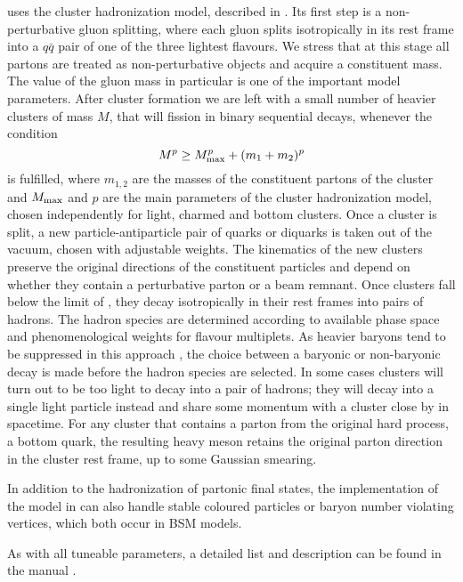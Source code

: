 \Herwigpp uses the cluster hadronization model, described in
.  Its first step is a non-perturbative gluon
splitting, where each gluon splits
isotropically in its rest frame into a $q\bar q$ pair of
one of the three lightest flavours. We stress that at this stage all
partons are treated as non-perturbative objects and acquire a
constituent mass.  The value of the gluon mass in particular is one of
the important model parameters.  After cluster formation we are left
with a small number of heavier clusters of mass $M$, that will fission
in binary sequential decays, whenever the condition
\begin{equation}
  \label{eq:clfission}
  M^p \geq M_{\rm max}^p +(m_1+m_2)^p
\end{equation}
is fulfilled, where $m_{1, 2}$ are the masses of the constituent partons
of the cluster and $M_{\rm max}$ and $p$ are the main parameters of the
cluster hadronization model, chosen independently for light,
charmed and bottom clusters.  Once a cluster is split, a new
particle-antiparticle pair of quarks or diquarks is taken out of the
vacuum, chosen with adjustable weights.  The kinematics of the new clusters
preserve the original directions of the constituent particles and depend
on whether they contain a perturbative parton or a beam remnant.  Once
clusters fall below the limit of , they
decay isotropically in their rest frames 
into pairs of hadrons.  The hadron species
are determined according to available phase space and phenomenological
weights for flavour multiplets.  As heavier baryons tend to be
suppressed in this approach \cite{Kupco:1998fx}, the choice between a
baryonic or non-baryonic decay is made before the hadron
species are selected.  In some cases clusters will turn out to be too
light to decay into a pair of hadrons; they will decay into a
single light particle instead and share some momentum with a 
cluster close by in spacetime.
For any cluster that contains a parton from the original hard
process, \eg a bottom quark, the resulting heavy meson retains the
original parton direction in the cluster rest frame, up to some Gaussian
smearing.

In addition to the hadronization of partonic final states, the
implementation of the model in \Herwigpp can also handle stable coloured
particles or baryon number violating vertices, which both occur in BSM models.

As with all tuneable parameters, a detailed list and description can be found
in the manual \cite{Bahr:2008pv}.


